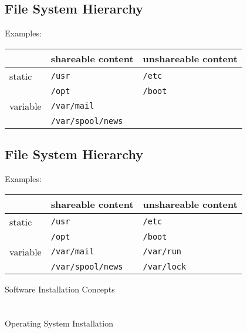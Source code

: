 \documentclass[xga]{xdvislides}
\begin{document}
\subsection{File System Hierarchy}
Examples:
\\

\begin{center}
\begin{tabular}{| l | l | l |}
	\hline
	& shareable content & unshareable content \\
	\hline
	static   & \verb+/usr+ & \verb+/etc+ \\
	         & \verb+/opt+ & \verb+/boot+ \\
	\hline
	variable & \verb+/var/mail+ & \\
	         & \verb+/var/spool/news+ & \\
	\hline
\end{tabular}
\end{center}

\subsection{File System Hierarchy}
Examples:
\\

\begin{center}
\begin{tabular}{| l | l | l |}
	\hline
	& shareable content & unshareable content \\
	\hline
	static   & \verb+/usr+ & \verb+/etc+ \\
	         & \verb+/opt+ & \verb+/boot+ \\
	\hline
	variable & \verb+/var/mail+ & \verb+/var/run+ \\
	         & \verb+/var/spool/news+ & \verb+/var/lock+ \\
	\hline
\end{tabular}
\end{center}

\newpage
\vspace*{\fill}
\begin{center}
	\Hugesize
		Software Installation Concepts \\ [1em]
	\hspace*{5mm}
	\blueline\\
	\hspace*{5mm}\\
		Operating System Installation
\end{center}
\vspace*{\fill}
\end{document}
